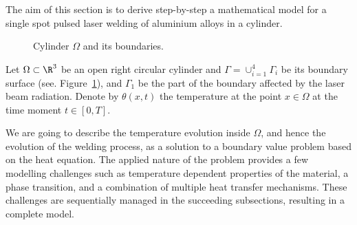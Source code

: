 The aim of this section is to derive step-by-step a mathematical model for a single spot pulsed laser welding of aluminium alloys in a cylinder.

\begin{figure}[ht]
	\centering
	
	\caption{Cylinder $\Omega$ and its boundaries.}
	\label{fig:cylinder}
\end{figure}

Let $\Omega	\subset \R^3$ be an open right circular cylinder and $\Gamma = \cup_{i=1}^4 \Gamma_i$ be its boundary surface (see. Figure~\ref{fig:cylinder}), and $\Gamma_1$ be the part of the boundary affected by the laser beam radiation.
Denote by $\theta(x,t)$ the temperature at the point $x \in \Omega$ at the time moment $t \in [0,T]$.

We are going to describe the temperature evolution inside $\Omega$, and hence the evolution of the welding process, as a solution to a boundary value problem based on the heat equation.
The applied nature of the problem provides a few modelling challenges such as temperature dependent properties of the material, a phase transition, and a combination of multiple heat transfer mechanisms.
These challenges are sequentially managed in the succeeding subsections, resulting in a complete model.



